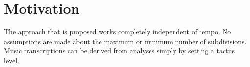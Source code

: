 \section{Motivation}
\label{sec:motivation}


The approach that is proposed works completely independent of tempo. No assumptions are made about the maximum or minimum number of subdivisions. Music transcriptions can be derived from analyses simply by setting a tactus level.
